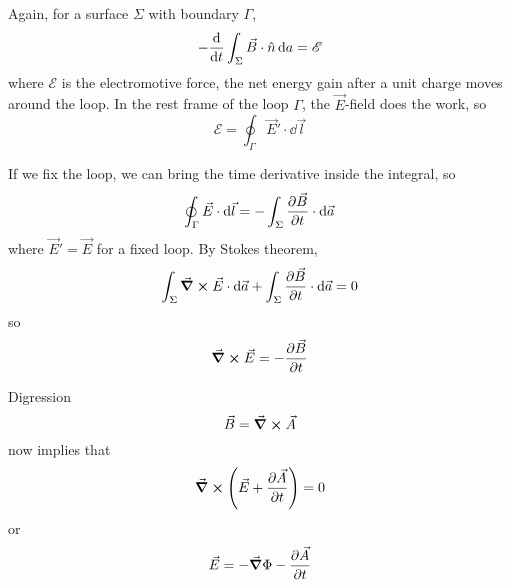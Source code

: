 \documentclass[a4paper,twoside,master.tex]{subfiles}
\begin{document}

Again, for a surface $ \Sigma $ with boundary $ \Gamma $,
\begin{equation}
    - \dv{t} \int_{\Sigma} \vec{B} \cdot \hat{n} \dd{a} = \mathscr{E}
\end{equation}
where $ \mathscr{E} $ is the electromotive force, the net energy gain after a unit charge moves around the loop. In the rest frame of the loop $ \Gamma $, the $ \vec{E} $-field does the work, so
\begin{equation}
    \mathscr{E} = \oint_{\Gamma} \vec{E}' \cdot \dd{\vec{l}}
\end{equation}

If we fix the loop, we can bring the time derivative inside the integral, so
\begin{equation}
    \oint_{\Gamma} \vec{E} \cdot \dd{\vec{l}} = - \int_{\Sigma} \pdv{ \vec{B}}{t} \cdot\dd{ \vec{a}}
\end{equation}
where $ \vec{E}' = \vec{E} $ for a fixed loop. By Stokes theorem,
\begin{equation}
    \int_{\Sigma} \curl{\vec{E}} \cdot \dd{\vec{a}} + \int_{\Sigma} \pdv{ \vec{B}}{t} \cdot\dd{ \vec{a}} = 0
\end{equation}
so
\begin{equation}
    \curl{\vec{E}} = - \pdv{\vec{B}}{t}
\end{equation}

\begin{note}{Digression}
    \begin{equation}
        \vec{B} = \curl{\vec{A}}
    \end{equation}
    now implies that
    \begin{equation}
        \curl{\left( \vec{E} + \pdv{\vec{A}}{t} \right)} = 0
    \end{equation}
    or
    \begin{equation}
        \vec{E} = - \grad{\Phi} - \pdv{\vec{A}}{t}
    \end{equation}
\end{note}
\end{document}
